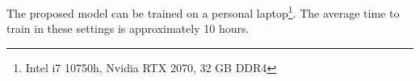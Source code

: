 
The proposed model can be trained on a personal
laptop\footnote{ Intel i7 10750h, Nvidia RTX 2070, 32 GB
DDR4}. The average time to train in these settings is
approximately 10 hours.
